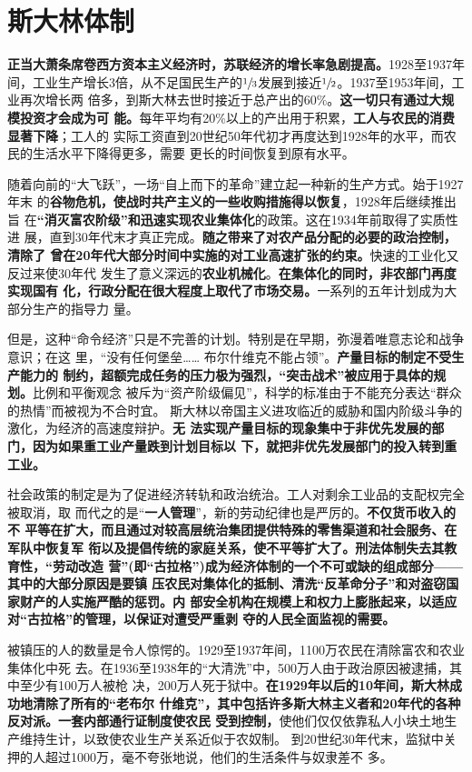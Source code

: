 \section{斯大林体制}

\textbf{正当大萧条席卷西方资本主义经济时，苏联经济的增长率急剧提高。}1928至1937年
间，工业生产增长3倍，从不足国民生产的$\sfrac{1}{3}$发展到接近$\sfrac{1}{2}$。1937至1953年间，工业再次增长两
倍多，到斯大林去世时接近于总产出的60\%。\textbf{这一切只有通过大规模投资才会成为可
  能。}每年平均有20\%以上的产出用于积累，\textbf{工人与农民的消费显著下降}；工人的
实际工资直到20世纪50年代初才再度达到1928年的水平，而农民的生活水平下降得更多，需要
更长的时间恢复到原有水平。

随着向前的“大飞跃”，一场“自上而下的革命”建立起一种新的生产方式。始于1927年末
的\textbf{谷物危机，使战时共产主义的一些收购措施得以恢复}，1928年后继续推出旨
在\textbf{“消灭富农阶级”和迅速实现农业集体化}的政策。这在1934年前取得了实质性进
展，直到30年代末才真正完成。\textbf{随之带来了对农产品分配的必要的政治控制，清除了
  曾在20年代大部分时间中实施的对工业高速扩张的约束。}快速的工业化又反过来使30年代
发生了意义深远的\textbf{农业机械化}。\textbf{在集体化的同时，非农部门再度实现国有
  化，行政分配在很大程度上取代了市场交易。}一系列的五年计划成为大部分生产的指导力
量。


但是，这种“命令经济”只是不完善的计划。特别是在早期，弥漫着唯意志论和战争意识；在这
里，“没有任何堡垒…… 布尔什维克不能占领”。\textbf{产量目标的制定不受生产能力的
  制约，超额完成任务的压力极为强烈，“突击战术”被应用于具体的规划。}比例和平衡观念
被斥为“资产阶级偏见”，科学的标准由于不能充分表达“群众的热情”而被视为不合时宜。
斯大林以帝国主义进攻临近的威胁和国内阶级斗争的激化，为经济的高速度辩护。\textbf{无
  法实现产量目标的现象集中于非优先发展的部门，因为如果重工业产量跌到计划目标以
  下，就把非优先发展部门的投入转到重工业。}

社会政策的制定是为了促进经济转轨和政治统治。工人对剩余工业品的支配权完全被取消，取
而代之的是“\textbf{一人管理}”，新的劳动纪律也是严厉的。\textbf{不仅货币收入的不
  平等在扩大，而且通过对较高层统治集团提供特殊的零售渠道和社会服务、在军队中恢复军
  衔以及提倡传统的家庭关系，使不平等扩大了。刑法体制失去其教育性，“劳动改造
  营”(即“古拉格”)成为经济体制的一个不可或缺的组成部分——其中的大部分原因是要镇
  压农民对集体化的抵制、清洗“反革命分子”和对盗窃国家财产的人实施严酷的惩罚。内
  部安全机构在规模上和权力上膨胀起来，以适应对“古拉格”的管理，以保证对遭受严重剥
  夺的人民全面监视的需要。}

被镇压的人的数量是令人惊愕的。1929至1937年间，1100万农民在清除富农和农业集体化中死
去。在1936至1938年的“大清洗”中，500万人由于政治原因被逮捕，其中至少有100万人被枪
决，200万人死于狱中。\textbf{在1929年以后的10年间，斯大林成功地清除了所有的“老布尔
  什维克”，其中包括许多斯大林主义者和20年代的各种反对派。一套内部通行证制度使农民
  受到控制，}使他们仅仅依靠私人小块土地生产维持生计，以致使农业生产关系近似于农奴制。
到20世纪30年代末，监狱中关押的人超过1000万，毫不夸张地说，他们的生活条件与奴隶差不
多。

